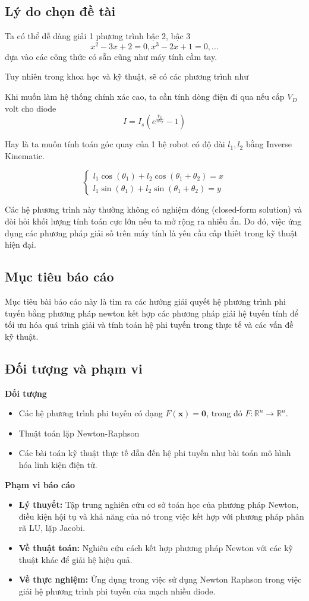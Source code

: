 \subsection{Lý do chọn đề tài}
Ta có thể dễ dàng giải 1 phương trình bậc 2, bậc 3 
$$ x^2-3x+2=0, x^3-2x+1=0,\dots$$dựa vào các công thức có sẵn cũng như máy tính cầm tay.

Tuy nhiên trong khoa học và kỹ thuật, sẽ có các phương trình như

Khi muốn làm hệ thống chính xác cao, ta cần tính dòng điện đi qua nếu cấp $V_D$ volt cho diode
$$I = I_s \left( e^{\frac{V_D}{nV_T}} - 1 \right)$$

Hay là ta muốn tính toán góc quay của 1 hệ robot có độ dài $l_1,l_2$ bằng Inverse Kinematic.

$$\begin{cases} l_1 \cos(\theta_1) + l_2 \cos(\theta_1 + \theta_2) = x \\ l_1 \sin(\theta_1) + l_2 \sin(\theta_1 + \theta_2) = y \end{cases}$$

Các hệ phương trình này thường không có nghiệm đóng (closed-form solution) và đòi hỏi khối lượng tính toán cực lớn nếu ta mở rộng ra nhiều ẩn. Do đó, việc ứng dụng các phương pháp giải số trên máy tính là yêu cầu cấp thiết trong kỹ thuật hiện đại.

\subsection{Mục tiêu báo cáo}

Mục tiêu bài báo cáo này là tìm ra các hướng giải quyết hệ phương trình phi tuyến bằng phương pháp newton kết hợp các phương pháp giải hệ tuyến tính để tối ưu hóa quá trình giải và tính toán hệ phi tuyến trong thực tế và các vấn đề kỹ thuật. 

\subsection{Đối tượng và phạm vi}
\textbf{Đối tượng}
\begin{itemize}
    \item Các hệ phương trình phi tuyến có dạng $F(\mathbf{x}) = \mathbf{0}$, trong đó $F: \mathbb{R}^n \to \mathbb{R}^n$.
    \item Thuật toán lặp Newton-Raphson 
    \item Các bài toán kỹ thuật thực tế dẫn đến hệ phi tuyến như bài toán mô hình hóa linh kiện điện tử.
\end{itemize}
\textbf{Phạm vi báo cáo}
\begin{itemize}
    \item \textbf{Lý thuyết:} Tập trung nghiên cứu cơ sở toán học của phương pháp Newton, điều kiện hội tụ và khả năng của nó trong việc kết hợp với phương pháp phân rã LU, lặp Jacobi.
    \item \textbf{Về thuật toán:} Nghiên cứu cách kết hợp phương pháp Newton với các kỹ thuật khác để giải hệ hiệu quả.

    \item \textbf{Về thực nghiệm:} Ứng dụng trong việc sử dụng Newton Raphson trong việc giải hệ phương trình phi tuyến của mạch nhiều diode.
\end{itemize}